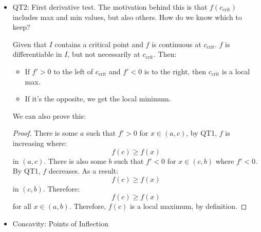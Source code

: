 \begin{itemize}
\begin{idea}
    \end{idea}
    We can prove the first statement.
    \begin{proof}
        Since $f$ is differentiable, the MVT holds. There is some $c\ in I$ such that:
        \begin{equation}
            f(x_2)-f(x_1)= f'(c)(x_2-x_1) \implies f(x_2)-f(x_1)
            \label{eq:}
        \end{equation}
        which is the definition of an increasing function. The proof goes similarly for the other two.
    \end{proof}
    \item QT2: First derivative test. The motivation behind this is that $f(c_\text{crit})$ includes max and min values, but also others. How do we know which to keep?
    \begin{idea}
        Given that $I$ contains a critical point and $f$ is continuous at $c_\text{crit}$. $f$ is differentiable in $I$, but not necessarily at $c_\text{crit}$. Then:
        \begin{itemize}
            \item If $f'>0$ to the left of $c_\text{crit}$ and $f'<0$ is to the right, then $c_\text{crit}$ is a local max.
            \item If it's the opposite, we get the local minimum.
        \end{itemize}
    \end{idea}
    We can also prove this:
    \begin{proof}
        There is some $a$ such that $f'>0$ for $x \in (a,c)$, by QT1, $f$ is increasing where:
        \begin{equation}
            f(c) \ge f(x)
            \label{eq:}
        \end{equation}
        in $(a,c)$. There is also some $b$ such that $f'<0$ for $x \in (c,b)$ where $f'<0$. By QT1, $f$ decreases. As a result:
        \begin{equation}
            f(c) \ge f(x)
            \label{eq:}
        \end{equation}
        in $(c,b)$. Therefore:
        \begin{equation}
            f(c) \ge f(x)
            \label{eq:}
        \end{equation}
        for all $x\in (a,b)$. Therefore, $f(c)$ is a local maximum, by definition. 
    \end{proof}
    \item Concavity: Points of Inflection
    \begin{definition}

\end{definition}
\end{itemize}
